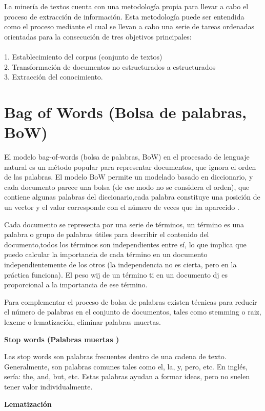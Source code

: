La minería de textos cuenta con una metodología propia para llevar a cabo el proceso de extracción de
información. Esta metodología puede ser entendida como el proceso mediante el cual se llevan a cabo
una serie de tareas ordenadas orientadas para la consecución de tres objetivos principales:\\ \\
1. Establecimiento del corpus (conjunto de textos)\\
2. Transformación de documentos no estructurados a estructurados\\
3. Extracción del conocimiento.

\section{Bag of Words (Bolsa de palabras, BoW)}
El modelo bag-of-words (bolsa de palabras, BoW) en el procesado de lenguaje
natural es un método popular para representar documentos, que ignora el orden de las
palabras. El modelo BoW permite un modelado basado en diccionario, y cada
documento parece una bolsa (de ese modo no se considera el orden), que contiene
algunas palabras del diccionario,cada palabra constituye una posición de un vector y el valor corresponde 
con el número de veces que ha aparecido \cite{pardo2009aplicacion}.

Cada documento se representa por una serie de términos, un término es una palabra o grupo de palabras útiles
para describir el contenido del documento,todos los términos son independientes entre sí, lo que implica que puedo
calcular la importancia de cada término en un documento independientemente de los otros 
(la independencia no es cierta, pero en la práctica funciona).
El peso wij de un término ti en un documento dj es proporcional a la importancia de ese término.

Para complementar el proceso de bolsa de palabras existen técnicas para reducir el
número de palabras en el conjunto de documentos, tales como stemming o raiz, lexeme o lematización, eliminar palabras muertas\cite{gomesGarcia}.


\textbf{Stop words (Palabras muertas )}

Las stop words son palabras frecuentes dentro de una cadena de texto. Generalmente, son
palabras comunes tales como el, la, y, pero, etc. En inglés, sería: the, and, but, etc. Estas
palabras ayudan a formar ideas, pero no suelen tener valor individualmente.

\textbf{Lematización}

